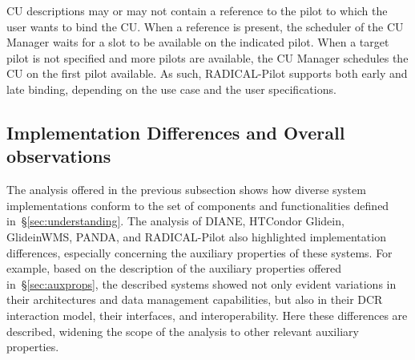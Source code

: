 \documentclass{sig-alternate}
\begin{document}
CU descriptions may or may not contain a reference to the pilot to which the
user wants to bind the CU. When a reference is present, the scheduler of the CU
Manager waits for a slot to be available on the indicated pilot. When a target
pilot is not specified and more pilots are available, the CU Manager schedules
the CU on the first pilot available. As such, RADICAL-Pilot supports both early
and late binding, depending on the use case and the user specifications.

%
\subsection{Implementation Differences and Overall observations}
\label{sec:context}





The analysis offered in the previous subsection shows how diverse \pilot system
implementations conform to the set of components and functionalities defined
in~\S\ref{sec:understanding}.  The analysis of DIANE, HTCondor Glidein,
GlideinWMS, PANDA, and RADICAL-Pilot also highlighted implementation
differences, especially concerning the auxiliary properties of these \pilot
systems. For example, based on the description of the auxiliary properties
offered in~\S\ref{sec:auxprops}, the described \pilot systems showed not only
evident variations in their architectures and data management capabilities, but
also in their DCR interaction model, their interfaces, and
interoperability. Here these differences are described, widening the scope of
the analysis to other relevant auxiliary properties.
\end{document}

